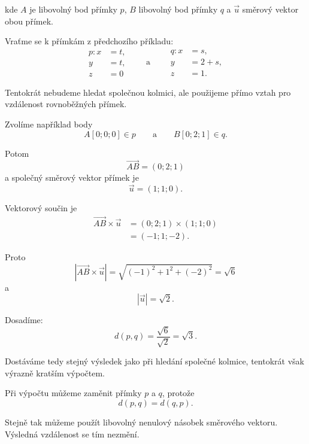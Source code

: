 kde $A$ je libovolný bod přímky $p$, $B$ libovolný bod přímky $q$
a $\vec{u}$ směrový vektor obou přímek.

\begin{example}
    \label{exa:Distance_parallel_lines_space}

    Vraťme se k přímkám z předchozího příkladu:
    \[
        \begin{aligned}
            p: x&=t,\\
            y&=t,\\
            z&=0
        \end{aligned}
        \qquad\text{a}\qquad
        \begin{aligned}
            q: x&=s,\\
            y&=2+s,\\
            z&=1.
        \end{aligned}
    \]

    Tentokrát nebudeme hledat společnou kolmici, ale použijeme
    přímo vztah pro vzdálenost rovnoběžných přímek.

    Zvolíme například body
    \[
        A[0;0;0]\in p
        \qquad\text{a}\qquad
        B[0;2;1]\in q.
    \]

    Potom
    \[
        \overrightarrow{AB}
        =
        (0;2;1)
    \]
    a společný směrový vektor přímek je
    \[
        \vec{u}=(1;1;0).
    \]

    Vektorový součin je
    \begin{align*}
        \overrightarrow{AB}\times\vec{u}
        &=
        (0;2;1)\times(1;1;0)\\
        &=
        (-1;1;-2).
    \end{align*}

    Proto
    \[
        |\overrightarrow{AB}\times\vec{u}|
        =
        \sqrt{(-1)^2+1^2+(-2)^2}
        =
        \sqrt6
    \]
    a
    \[
        |\vec{u}|=\sqrt2.
    \]

    Dosadíme:
    \[
        d(p,q)
        =
        \frac{\sqrt6}{\sqrt2}
        =
        \sqrt3.
    \]

    Dostáváme tedy stejný výsledek jako při hledání společné kolmice,
    tentokrát však výrazně kratším výpočtem.
\end{example}

\begin{remark}
    Při výpočtu můžeme zaměnit přímky $p$ a $q$, protože
    \[
        d(p,q)=d(q,p).
    \]

    Stejně tak můžeme použít libovolný nenulový násobek směrového
    vektoru. Výsledná vzdálenost se tím nezmění.
\end{remark}

